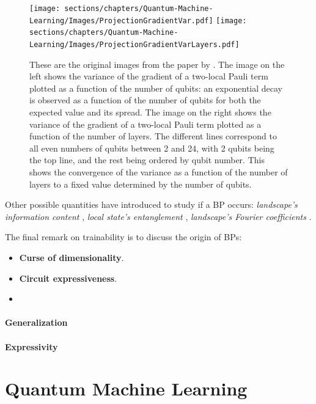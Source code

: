 \begin{figure}
    \centering
    \texttt{[image: sections/chapters/Quantum-Machine-Learning/Images/ProjectionGradientVar.pdf]}
    \texttt{[image: sections/chapters/Quantum-Machine-Learning/Images/ProjectionGradientVarLayers.pdf]}
    \caption{These are the original images from the paper by \cite{McClean_2018}. 
    The image on the left shows the variance of the gradient of a two-local Pauli term plotted as a function of 
    the number of qubits: an exponential decay is observed as a function of the number 
    of qubits for both the expected value and its spread.
    The image on the right shows the variance of the gradient of a two-local Pauli term plotted as a function of the 
    number of layers. The different lines correspond to all even numbers of qubits between 
    2 and 24, with 2 qubits being the top line, and the rest being ordered by qubit number. This shows 
    the convergence of the variance as a function of the number of layers to a fixed value determined by the 
    number of qubits.
    }
    \label{figure:McClean}
\end{figure}

Other possible quantities have introduced to study if a BP occurs: \textit{landscape's information content} \cite{P_rez_Salinas_2024}, 
\textit{local state's entanglement} \cite{Sack_2022}, \textit{landscape's Fourier coefficients} \cite{okumura2023, Nemkov_2023}.

The final remark on trainability is to discuss the origin of BPs:

\begin{itemize}
    \item \textbf{Curse of dimensionality}.\\
    \item \textbf{Circuit expressiveness}.\\
    \item 
\end{itemize}

\paragraph{Generalization}


\paragraph{Expressivity}



\section{Quantum Machine Learning}

